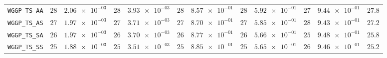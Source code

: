 \begin{xltabular}{\textwidth}{l||cC|cC|cC|cC|cC||c}
	\texttt{WGGP\_TS\_AA} & $ 28$ & $ \num{2.06e-03}$ & $ 28$ & $ \num{3.93e-03}$ & $ 28$ & $ \num{8.57e-01}$ & $ 28$ & $ \num{5.92e-01}$ & $ 27$ & $ \num{9.44e-01}$ & $ 27.8$  \\
	\texttt{WGGP\_TS\_AS} & $ 27$ & $ \num{1.97e-03}$ & $ 27$ & $ \num{3.71e-03}$ & $ 27$ & $ \num{8.70e-01}$ & $ 27$ & $ \num{5.85e-01}$ & $ 28$ & $ \num{9.43e-01}$ & $ 27.2$  \\
	\texttt{WGGP\_TS\_SA} & $ 26$ & $ \num{1.97e-03}$ & $ 26$ & $ \num{3.70e-03}$ & $ 26$ & $ \num{8.77e-01}$ & $ 26$ & $ \num{5.66e-01}$ & $ 25$ & $ \num{9.48e-01}$ & $ 25.8$  \\
	\texttt{WGGP\_TS\_SS} & $ 25$ & $ \num{1.88e-03}$ & $ 25$ & $ \num{3.51e-03}$ & $ 25$ & $ \num{8.85e-01}$ & $ 25$ & $ \num{5.65e-01}$ & $ 26$ & $ \num{9.46e-01}$ & $ 25.2$  \\
\end{xltabular}

